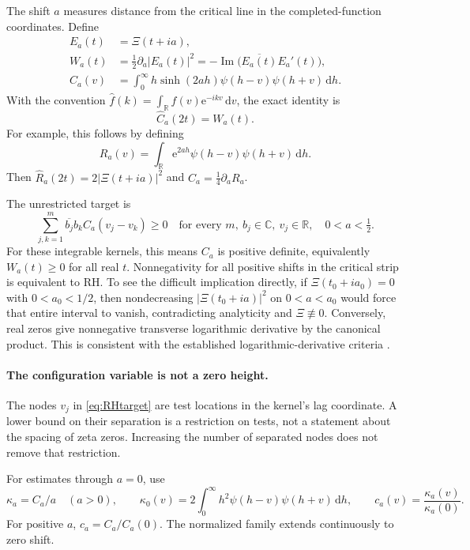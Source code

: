 \documentclass[11pt,letterpaper]{article}
\numberwithin{equation}{section}
\theoremstyle{remark}\newtheorem{remark}[theorem]{Remark}
\newcommand{\R}{\mathbb R}
\newcommand{\C}{\mathbb C}
\newcommand{\dd}{\,\mathrm d}
\newcommand{\ee}{\mathrm e}
\newcommand{\Impart}{\operatorname{Im}}
\begin{document}
The shift $a$ measures distance from the critical line in the completed-function coordinates. Define
\begin{align}
E_a(t)&=\Xi(t+ia),\\
W_a(t)&=\tfrac12\partial_a|E_a(t)|^2
=-\Impart\bigl(\overline{E_a(t)}E_a'(t)\bigr),\label{eq:W}\\
C_a(v)&=\int_0^\infty h\sinh(2ah)
\psi(h-v)\psi(h+v)\dd h.\label{eq:C}
\end{align}
With the convention $\widehat f(k)=\int_{\R}f(v)\ee^{-ikv}\dd v$, the exact identity is
\begin{equation}\label{eq:Fourier}
\boxed{\widehat C_a(2t)=W_a(t).}
\end{equation}
For example, this follows by defining
\[
R_a(v)=\int_{\R}\ee^{2ah}\psi(h-v)\psi(h+v)\dd h.
\]
Then $\widehat R_a(2t)=2|\Xi(t+ia)|^2$ and $C_a=\tfrac14\partial_aR_a$.

The unrestricted target is
\begin{equation}\label{eq:RHtarget}
\sum_{j,k=1}^m\overline{b_j}b_k C_a(v_j-v_k)\ge0
\quad\text{for every }m,\ b_j\in\C,\ v_j\in\R,
\quad 0<a<\tfrac12.
\end{equation}
For these integrable kernels, this means $C_a$ is positive definite, equivalently $W_a(t)\ge0$ for all real $t$. Nonnegativity for all positive shifts in the critical strip is equivalent to RH. To see the difficult implication directly, if $\Xi(t_0+ia_0)=0$ with $0<a_0<1/2$, then nondecreasing $|\Xi(t_0+ia)|^2$ on $0<a<a_0$ would force that entire interval to vanish, contradicting analyticity and $\Xi\not\equiv0$. Conversely, real zeros give nonnegative transverse logarithmic derivative by the canonical product. This is consistent with the established logarithmic-derivative criteria \cite{lagarias,lagariasCorrection}.

\paragraph{The configuration variable is not a zero height.}
The nodes $v_j$ in \eqref{eq:RHtarget} are test locations in the kernel's lag coordinate. A lower bound on their separation is a restriction on tests, not a statement about the spacing of zeta zeros. Increasing the number of separated nodes does not remove that restriction.

For estimates through $a=0$, use
\begin{equation}\label{eq:kappa}
\kappa_a=C_a/a\quad(a>0),\qquad
\kappa_0(v)=2\int_0^\infty h^2\psi(h-v)\psi(h+v)\dd h,
\qquad c_a(v)=\frac{\kappa_a(v)}{\kappa_a(0)}.
\end{equation}
For positive $a$, $c_a=C_a/C_a(0)$. The normalized family extends continuously to zero shift.
\end{document}

